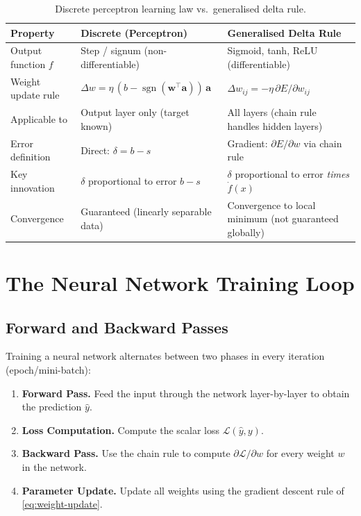 \documentclass[12pt,a4paper]{article}
\newcommand{\Loss}{\mathcal{L}}
\newcommand{\yhat}{\hat{y}}
\begin{document}
\begin{table}[htbp]
\centering
\caption{Discrete perceptron learning law vs.\ generalised delta rule.}
\label{tab:delta-rules}
\renewcommand{\arraystretch}{1.5}
\begin{tabularx}{\linewidth}{lXX}
\toprule
\textbf{Property} & \textbf{Discrete (Perceptron)} & \textbf{Generalised Delta Rule} \\
\midrule
Output function $f$
  & Step / signum (non-differentiable)
  & Sigmoid, tanh, ReLU (differentiable) \\
Weight update rule
  & $\Delta w = \eta\,(b - \operatorname{sgn}(\mathbf{w}^{\top}\mathbf{a}))\,\mathbf{a}$
  & $\Delta w_{ij} = -\eta\,\partial E/\partial w_{ij}$ \\
Applicable to
  & Output layer only (target known)
  & All layers (chain rule handles hidden layers) \\
Error definition
  & Direct: $\delta = b - s$
  & Gradient: $\partial E / \partial w$ via chain rule \\
Key innovation
  & $\delta$ proportional to error $b - s$
  & $\delta$ proportional to error \emph{times} $\dot{f}(x)$ \\
Convergence
  & Guaranteed (linearly separable data)
  & Convergence to local minimum (not guaranteed globally) \\
\bottomrule
\end{tabularx}
\end{table}

\section{The Neural Network Training Loop}
\label{sec:training-loop}

\subsection{Forward and Backward Passes}
\label{subsec:fwd-bwd}

Training a neural network alternates between two phases in every iteration
(epoch/mini-batch):

\begin{enumerate}[label=\textbf{Phase \arabic*.}]
  \item \textbf{Forward Pass.} Feed the input through the network
    layer-by-layer to obtain the prediction $\yhat$.
  \item \textbf{Loss Computation.} Compute the scalar loss
    $\Loss(\yhat, y)$.
  \item \textbf{Backward Pass.} Use the chain rule to compute
    $\partial\Loss/\partial w$ for every weight $w$ in the network.
  \item \textbf{Parameter Update.} Update all weights using the gradient
    descent rule of \cref{eq:weight-update}.
\end{enumerate}
\end{document}

